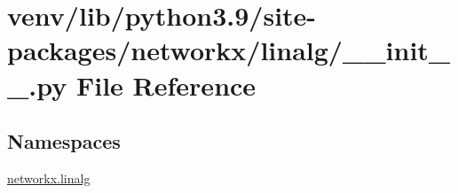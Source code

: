 \hypertarget{venv_2lib_2python3_89_2site-packages_2networkx_2linalg_2____init_____8py}{}\section{venv/lib/python3.9/site-\/packages/networkx/linalg/\+\_\+\+\_\+init\+\_\+\+\_\+.py File Reference}
\label{venv_2lib_2python3_89_2site-packages_2networkx_2linalg_2____init_____8py}
\subsection*{Namespaces}
\begin{DoxyCompactItemize}
\item 
 \hyperlink{namespacenetworkx_1_1linalg}{networkx.\+linalg}
\end{DoxyCompactItemize}
